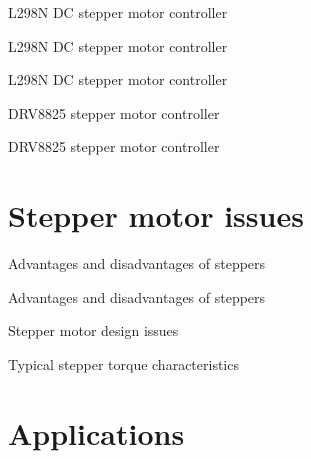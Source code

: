 \documentclass[compress]{beamer}
\begin{document}
{
    \begin{frame}{L298N DC stepper motor controller}
    \end{frame}
}

{
    \begin{frame}{L298N DC stepper motor controller}
    \end{frame}
}

{
    \begin{frame}{L298N DC stepper motor controller}
    \end{frame}
}

{
    \begin{frame}{DRV8825 stepper motor controller}
    \end{frame}
}

{
    \begin{frame}{DRV8825 stepper motor controller}
    \end{frame}
}

\section[Limits]{Stepper motor issues}

{
    \begin{frame}{Advantages and disadvantages of steppers}
    \end{frame}
}

{
    \begin{frame}{Advantages and disadvantages of steppers}
    \end{frame}
}
{
    \begin{frame}{Stepper motor design issues}
    \end{frame}
}

{
    \begin{frame}{Typical stepper torque characteristics}
    \end{frame}
}

\section{Applications}
\end{document}
